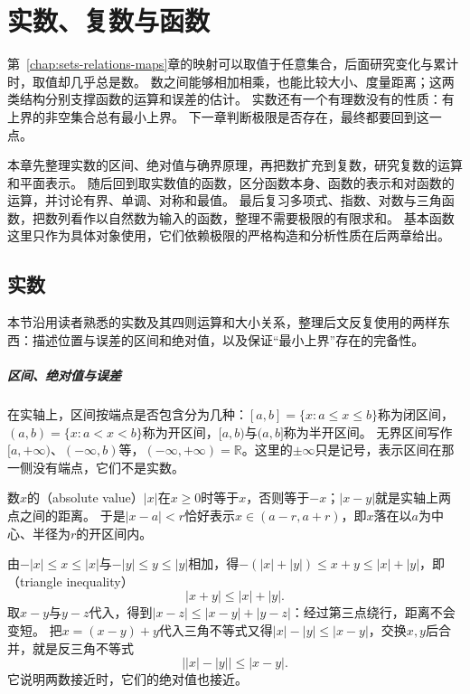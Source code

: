 \chapter{实数、复数与函数}
\label{chap:real-complex-functions}

第~\ref{chap:sets-relations-maps}章的映射可以取值于任意集合，后面研究变化与累计时，取值却几乎总是数。
数之间能够相加相乘，也能比较大小、度量距离；这两类结构分别支撑函数的运算和误差的估计。
实数还有一个有理数没有的性质：有上界的非空集合总有最小上界。
下一章判断极限是否存在，最终都要回到这一点。

本章先整理实数的区间、绝对值与确界原理，再把数扩充到复数，研究复数的运算和平面表示。
随后回到取实数值的函数，区分函数本身、函数的表示和对函数的运算，并讨论有界、单调、对称和最值。
最后复习多项式、指数、对数与三角函数，把数列看作以自然数为输入的函数，整理不需要极限的有限求和。
基本函数这里只作为具体对象使用，它们依赖极限的严格构造和分析性质在后两章给出。

\section{实数}
\label{sec:ru-real-numbers}
\label{sec:real-valued-functions-bounds}

本节沿用读者熟悉的实数及其四则运算和大小关系，整理后文反复使用的两样东西：描述位置与误差的区间和绝对值，以及保证“最小上界”存在的完备性。

\paragraph{区间、绝对值与误差}
在实轴上，区间按端点是否包含分为几种：$[a,b]=\{x:a\leq x\leq b\}$称为闭区间，$(a,b)=\{x:a<x<b\}$称为开区间，$[a,b)$与$(a,b]$称为半开区间。
无界区间写作$[a,+\infty)$、$(-\infty,b)$等，$(-\infty,+\infty)=\mathbb R$。这里的$\pm\infty$只是记号，表示区间在那一侧没有端点，它们不是实数。

数$x$的（absolute value）$|x|$在$x\geq0$时等于$x$，否则等于$-x$；$|x-y|$就是实轴上两点之间的距离。
于是$|x-a|<r$恰好表示$x\in(a-r,a+r)$，即$x$落在以$a$为中心、半径为$r$的开区间内。

由$-|x|\leq x\leq|x|$与$-|y|\leq y\leq|y|$相加，得$-(|x|+|y|)\leq x+y\leq|x|+|y|$，即（triangle inequality）
\[
 |x+y|\leq|x|+|y|.
\]
取$x-y$与$y-z$代入，得到$|x-z|\leq|x-y|+|y-z|$：经过第三点绕行，距离不会变短。
把$x=(x-y)+y$代入三角不等式又得$|x|-|y|\leq|x-y|$，交换$x,y$后合并，就是反三角不等式
\[
 \bigl||x|-|y|\bigr|\leq|x-y|.
\]
它说明两数接近时，它们的绝对值也接近。

